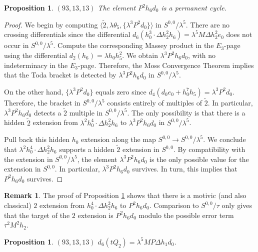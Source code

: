 \documentclass{amsart}
\newtheorem{prop}[thm]{Proposition}
\theoremstyle{definition}
\newtheorem{rmk}[thm]{Remark}
\newcommand{\map}{\rightarrow}
\newcommand{\hsf}{\widetilde{2}}
\newcommand{\lemdeg}[1]{$({#1})$}
\newcommand{\D}{\Delta}
\begin{document}
\begin{prop}
\label{prop:perm-P^2h6d0}
\lemdeg{93, 13, 13}
The element $P^2 h_6 d_0$ is a permanent cycle.
\end{prop}


\begin{proof}
We begin by computing
$\langle \hsf, \lambda \theta_5, \{\lambda^3 P^2 d_0\} \rangle$ in $S^{0,0}/\lambda^5$.  
There are no crossing differentials since the
differential $d_6(h_0^3 \cdot \D h_2^2 h_6) = \lambda^5 M \D h_2^2 e_0$
does not occur in $S^{0,0}/\lambda^5$.
Compute the corresponding Massey product in the $E_3$-page using
the differential $d_2(h_6) = \lambda h_0 h_5^2$.
We obtain $\lambda^3 P^2 h_6 d_0$, with no indeterminacy in the $E_3$-page.
Therefore, the Moss Convergence Theorem implies that
the Toda bracket is detected by $\lambda^3 P^2 h_6 d_0$ in
$S^{0,0}/\lambda^5$.

On the other hand, $\{\lambda^3 P^2 d_0\}$ equals zero since
$d_4(d_0 e_0 + h_0^7 h_5) = \lambda^3 P^2 d_0$.
Therefore, the bracket in $S^{0,0}/\lambda^5$ consists entirely of multiples
of $\hsf$.  In particular, $\lambda^3 P^2 h_6 d_0$ detects a
$\hsf$ multiple
in $S^{0,0}/\lambda^5$.  
The only possibility is that there is a hidden $\hsf$ extension from 
$\lambda^2 h_0^4 \cdot \D h_2^2 h_6$ to $\lambda^3 P^2 h_6 d_0$ in $S^{0,0}/\lambda^5$.

Pull back this hidden $h_0$ extension along 
the map $S^{0,0} \map S^{0,0}/\lambda^5$.  We conclude that
$\lambda^2 h_0^4 \cdot \D h_2^2 h_6$ supports a hidden $\hsf$ extension
in $S^{0,0}$.  By compatibility with the extension in $S^{0,0}/\lambda^5$,
the element $\lambda^3 P^2 h_6 d_0$ is the only possible value for the extension in $S^{0,0}$.
In particular, $\lambda^3 P^2 h_6 d_0$ survives.  In turn, this implies
that $P^2 h_6 d_0$ survives.
\end{proof}

\begin{rmk}
The proof of Proposition \ref{prop:perm-P^2h6d0} shows that
there is a motivic (and also classical) $2$ extension from
$h_0^4 \cdot \D h_2^2 h_6$ to $P^2 h_6 d_0$.
Comparison to $S^{0,0}/\tau$ only gives that the target of the $2$ extension
is $P^2 h_6 d_0$ modulo the possible error term
$\tau^2 M^2 h_2$.
\end{rmk}

\begin{prop}
\label{prop:d6-tQ2}
\lemdeg{93, 13, 13}
$d_6(t Q_2) = \lambda^5 M P \D h_1 d_0$.
\end{prop}
\end{document}
